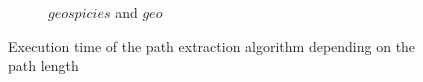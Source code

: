 \begin{figure}
\begin{subfigure}{0.32\textwidth}
\caption{$geospicies$ and $geo$} \label{fig:extractTimeGeo}
\end{subfigure}
\caption{Execution time of the path extraction algorithm depending on the path length}
\label{fig:extractTime}
\end{figure}

